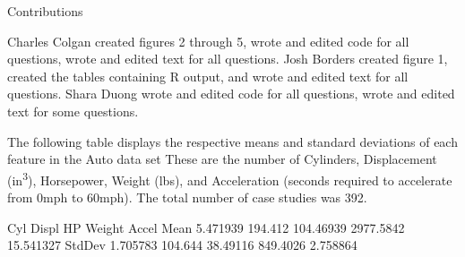 \documentclass{homework}
\begin{document}
\maketitle

Contributions

Charles Colgan created figures 2 through 5, wrote and edited code for all questions, wrote and edited text for all questions.
Josh Borders created figure 1, created the tables containing R output, and wrote and edited text for all questions.
Shara Duong wrote and edited code for all questions, wrote and edited text for some questions.

\question
The following table displays the respective means and standard deviations of each feature in the Auto data set These are the number of Cylinders, Displacement (in\textsuperscript{3}), Horsepower, Weight (lbs), and Acceleration (seconds required to accelerate from 0mph to 60mph). The total number of case studies was 392.
\begin{rc}
           Cyl   Displ        HP    Weight     Accel
Mean   5.471939 194.412 104.46939 2977.5842 15.541327
StdDev 1.705783 104.644  38.49116  849.4026  2.758864
\end{rc}
\end{document}
